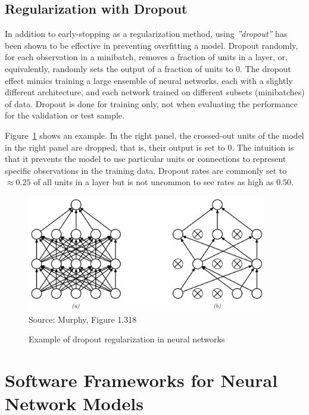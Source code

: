 \subsection{Regularization with Dropout}

In addition to early-stopping as a regularization method, using \emph{''dropout''} has been shown to be effective in preventing overfitting a model. Dropout randomly, for each observation in a minibatch, removes a fraction of units in a layer, or, equivalently, randomly sets the output of a fraction of units to 0. The dropout effect mimics training a large ensemble of neural networks, each with a slightly different architecture, and each network trained on different subsets (minibatches) of data. Dropout is done for training only, not when evaluating the performance for the validation or test sample.

Figure~\ref{fig:screen7} shows an example. In the right panel, the crossed-out units of the model in the right panel are dropped, that is, their output is set to 0. The intuition is that it prevents the model to use particular units or connections to represent specific observations in the training data. Dropout rates are commonly set to $\approx 0.25$ of all units in a layer but is not uncommon to see rates as high as $0.50$.

\begin{figure}
\centering
\includegraphics[height=2in]{screen7.png} \\

\scriptsize Source: Murphy, Figure 1.318
\caption{Example of dropout regularization in neural networks}
\label{fig:screen7}
\end{figure}

\section{Software Frameworks for Neural Network Models}

